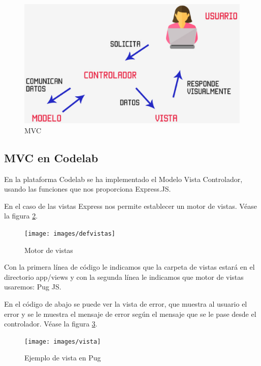 \begin{figure}[!th]
\begin{center}
\includegraphics[scale=0.3]{images/29}
\caption{MVC}
\label{fig:MVC}
\end{center}
\end{figure}

\subsection{MVC en Codelab}
\label{3:3:2}

En la plataforma Codelab se ha implementado el Modelo Vista Controlador,
usando las funciones que nos proporciona Express.JS.

En el caso de las vistas Express nos permite establecer un motor de vistas. Véase la figura \ref{fig:Motor de vistas}.

\begin{figure}[!th]
\begin{center}
\texttt{[image: images/defvistas]}
\caption{Motor de vistas}
\label{fig:Motor de vistas}
\end{center}
\end{figure}

Con la primera línea de código le indicamos que la carpeta de vistas estará en el directorio app/views y con la segunda línea le indicamos que motor de vistas usaremos: Pug JS. 

En el código de abajo se puede ver la vista de error, que muestra al usuario el error y se le muestra el mensaje de error según el mensaje que se le pase desde el controlador.
Véase la figura \ref{fig:Ejemplo de vista en Pug}.

\begin{figure}[!th]
\begin{center}
\texttt{[image: images/vista]}
\caption{Ejemplo de vista en Pug}
\label{fig:Ejemplo de vista en Pug}
\end{center}
\end{figure}

